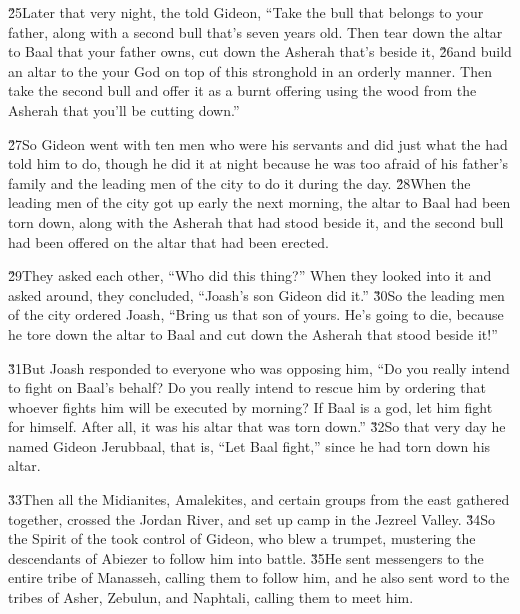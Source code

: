 \v{25}Later that very night, the  told Gideon, ``Take the bull that belongs to your father, along with a second bull that's seven years old. Then tear down the altar to Baal that your father owns, cut down the Asherah that's beside it, \v{26}and build an altar to the  your God on top of this stronghold in an orderly manner. Then take the second bull and offer it as a burnt offering using the wood from the Asherah that you'll be cutting down.''

\v{27}So Gideon went with ten men who were his servants and did just what the  had told him to do, though he did it at night because he was too afraid of his father's family and the leading men of the city to do it during the day. \v{28}When the leading men of the city got up early the next morning, the altar to Baal had been torn down, along with the Asherah that had stood beside it, and the second bull had been offered on the altar that had been erected.

\v{29}They asked each other, ``Who did this thing?'' When they looked into it and asked around, they concluded, ``Joash's son Gideon did it.'' \v{30}So the leading men of the city ordered Joash, ``Bring us that son of yours. He's going to die, because he tore down the altar to Baal and cut down the Asherah that stood beside it!''

\v{31}But Joash responded to everyone who was opposing him, ``Do you really intend to fight on Baal's behalf? Do you really intend to rescue him by ordering that whoever fights him will be executed by morning? If Baal is a god, let him fight for himself. After all, it was his altar that was torn down.'' \v{32}So that very day he named Gideon Jerubbaal, that is, ``Let Baal fight,'' since he had torn down his altar.

\v{33}Then all the Midianites, Amalekites, and certain groups from the east gathered together, crossed the Jordan River, and set up camp in the Jezreel Valley. \v{34}So the Spirit of the  took control of Gideon, who blew a trumpet, mustering the descendants of Abiezer to follow him into battle. \v{35}He sent messengers to the entire tribe of Manasseh, calling them to follow him, and he also sent word to the tribes of Asher, Zebulun, and Naphtali, calling them to meet him.

